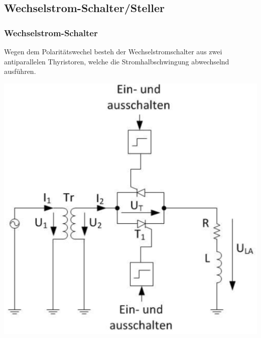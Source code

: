 \subsection{Wechselstrom-Schalter/Steller}
\subsubsection{Wechselstrom-Schalter}
\begin{minipage}{0.6\linewidth}
    Wegen dem Polaritätswechel besteh der Wechselstromschalter aus zwei antiparallelen Thyristoren, welche die Stromhalbschwingung abwechselnd ausführen.
\end{minipage}

\begin{minipage}{0.3\linewidth}
    \includegraphics[width=\linewidth]{images/SchemaWSSchalter}
\end{minipage}
